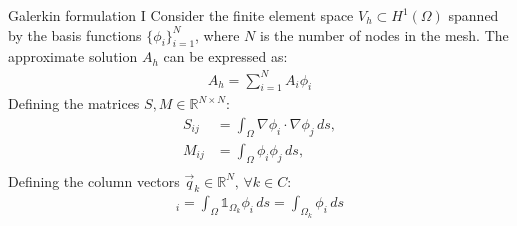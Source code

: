 \documentclass[aspectratio=54,xcolor=dvipsnames]{beamer}
\begin{document}
\begin{frame}{Galerkin formulation I}
    Consider the finite element space $V_h \subset H^1(\Omega)$ spanned by the basis functions $\{\phi_i\}_{i=1}^{N}$, where $N$ is the number of nodes in the mesh. The approximate solution $A_h$ can be expressed as:
    \begin{align*}
        A_h = \sum_{i=1}^{N} A_i \phi_i
    \end{align*}
    Defining the matrices $S, M \in \mathbb{R}^{N \times N}$:
    \begin{align*}
        S_{ij} &= \int_{\Omega} \nabla \phi_i \cdot \nabla \phi_j \, ds, \\
        M_{ij} &= \int_{\Omega} \phi_i \phi_j \, ds, \\
    \end{align*}
    Defining the column vectors $\vec{q}_k \in \mathbb{R}^N, \, \forall k \in C $:
    \begin{align*}
        [\vec{q}_k]_i = \int_{\Omega} \mathds{1}_{\Omega_k} \phi_i \, ds = \int_{\Omega_k} \phi_i \, ds
    \end{align*}

\end{frame}
\end{document}
